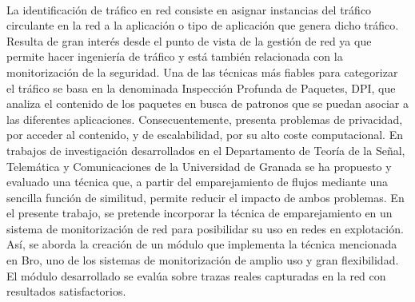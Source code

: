 \chapter*{}






\cleardoublepage
\thispagestyle{empty}

\begin{center}
{\large\bfseries \myTitle}\\
\end{center}
\begin{center}
\myName\\
\end{center}

\\

\vspace{0.7cm}
\\
La identificación de tráfico en red consiste en asignar instancias del tráfico circulante en la red a la aplicación o tipo de aplicación que genera dicho tráfico. Resulta de gran interés desde el punto de vista de la gestión de red ya que permite hacer ingeniería de tráfico y está también relacionada con la monitorización de la seguridad.
\intro Una de las técnicas más fiables para categorizar el tráfico se basa en la denominada Inspección Profunda de Paquetes, DPI, que analiza el contenido de los paquetes en busca de patronos que se puedan asociar a las diferentes aplicaciones. Consecuentemente, presenta problemas de privacidad, por acceder al contenido, y de escalabilidad, por su alto coste computacional.
\intro En trabajos de investigación desarrollados en el Departamento de Teoría de la Señal, Telemática y Comunicaciones de la Universidad de Granada se ha propuesto y evaluado una técnica que, a partir del emparejamiento de flujos mediante una sencilla función de similitud, permite reducir el impacto de ambos problemas.
\intro En el presente trabajo, se pretende incorporar la técnica de emparejamiento en un sistema de monitorización de red para posibilidar su uso en redes en explotación. Así, se aborda la creación de un módulo que implementa la técnica mencionada en Bro, uno de los sistemas de monitorización de amplio uso y gran flexibilidad. El módulo desarrollado se evalúa sobre trazas reales capturadas en la red con resultados satisfactorios.
\cleardoublepage


